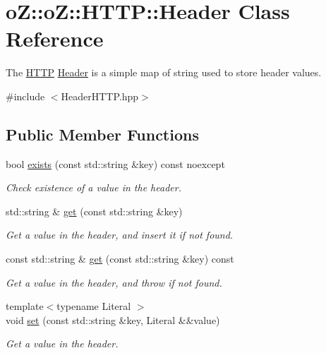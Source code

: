 \hypertarget{classo_z_1_1o_z_1_1_h_t_t_p_1_1_header}{}\section{oZ\+::oZ\+::H\+T\+TP\+::Header Class Reference}
\label{classo_z_1_1o_z_1_1_h_t_t_p_1_1_header}


The \mbox{\hyperlink{namespaceo_z_1_1o_z_1_1_h_t_t_p}{H\+T\+TP}} \mbox{\hyperlink{classo_z_1_1o_z_1_1_h_t_t_p_1_1_header}{Header}} is a simple map of string used to store header values.  




{\ttfamily \#include $<$Header\+H\+T\+T\+P.\+hpp$>$}

\subsection*{Public Member Functions}
\begin{DoxyCompactItemize}
\item 
bool \mbox{\hyperlink{classo_z_1_1o_z_1_1_h_t_t_p_1_1_header_ab1d6ccb2829b59d61de00e9000929ede}{exists}} (const std\+::string \&key) const noexcept
\begin{DoxyCompactList}\small\item\em Check existence of a value in the header. \end{DoxyCompactList}\item 
std\+::string \& \mbox{\hyperlink{classo_z_1_1o_z_1_1_h_t_t_p_1_1_header_a6d679d9431ae700a22accadd77616194}{get}} (const std\+::string \&key)
\begin{DoxyCompactList}\small\item\em Get a value in the header, and insert it if not found. \end{DoxyCompactList}\item 
const std\+::string \& \mbox{\hyperlink{classo_z_1_1o_z_1_1_h_t_t_p_1_1_header_acb0cba9e469ca227411584a4d5485b91}{get}} (const std\+::string \&key) const
\begin{DoxyCompactList}\small\item\em Get a value in the header, and throw if not found. \end{DoxyCompactList}\item 
{\footnotesize template$<$typename Literal $>$ }\\void \mbox{\hyperlink{classo_z_1_1o_z_1_1_h_t_t_p_1_1_header_ae42db1a4bb2515ca7474f3439d7e6804}{set}} (const std\+::string \&key, Literal \&\&value)
\begin{DoxyCompactList}\small\item\em Get a value in the header. \end{DoxyCompactList}\end{DoxyCompactItemize}


